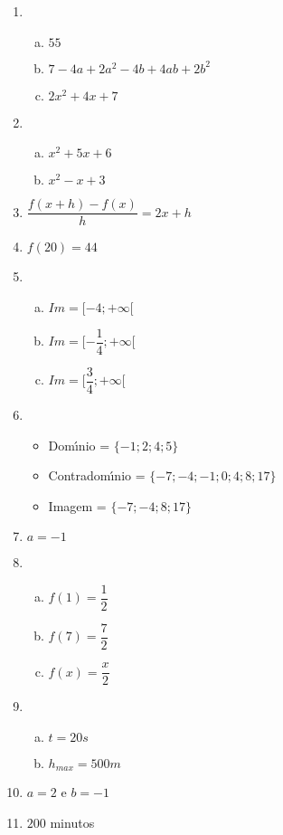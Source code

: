 \documentclass[12pt]{article}
\begin{document}
\begin{res}
\begin{multicols}{2}

\begin{enumerate}[(1)]

\item\begin{enumerate}[(a)]
\item $55$
\item $7 - 4 a + 2 a^{2} - 4 b + 4 a b + 2 b^{2}$
\item $2x^{2}+4x+7$
\end{enumerate}

\item\begin{enumerate}[(a)]
\item $x^{2}+5x+6$
\item $x^{2}-x+3$
\end{enumerate}

\item $\dfrac{f\left( x+h\right) -f\left( x\right) }{h}=2x+h$

\item $f\left( 20\right)=44$

\item\begin{enumerate}[(a)]
\item $Im=[-4;+\infty[$
\item $Im=[-\dfrac{1}{4};+\infty[$
\item $Im=[\dfrac{3}{4};+\infty[$
\end{enumerate}
\columnbreak
\item \begin{itemize}
  \item Dom\'{\i}nio = $\{ -1;2;4;5\}$
  \item Contradom\'{\i}nio = $\{-7;-4;-1;0;4;8;17\}$
  \item Imagem = $\{-7;-4;8;17\}$
\end{itemize}

\item $a=-1$

\item\begin{enumerate}[(a)]
\item $f\left( 1\right)=\dfrac{1}{2}$
\item  $f\left( 7\right)=\dfrac{7}{2}$
\item  $f\left( x\right)=\dfrac{x}{2}$
\end{enumerate}

\item\begin{enumerate}[(a)]
\item $t=20s$
\item  $h_{max}=500m$
\end{enumerate}

\item $a=2$ e $b=-1$

\item $200$ minutos

\end{enumerate}
\end{multicols}
\end{res}
\end{document}
